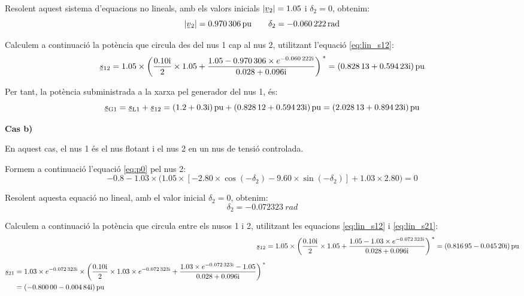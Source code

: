 \begin{exemple}
    Resolent aquest sistema d'equacions no lineals, amb els valors inicials $|\cmplx{v}_2|=\num{1,05}$ i $\delta_2=0$, obtenim:
    \[ 
    	|\cmplx{v}_2|=\qty{0,970306}{pu} \qquad \delta_2=\qty{-0,060222}{rad} 
    \]

    Calculem a continuació la potència que circula des del nus 1 cap al
    nus 2, utilitzant l'equació \eqref{eq:lin_s12}:
    \[
    \cmplx{s}_{12} = \num{1,05}\times \left( \frac{\complexnum{j0,10}}{2} \times \num{1,05} + \frac{ \num{1,05} -
    \num{0,970306}\times e^{\complexnum{-j0,060222}}} {\complexnum{0,028+j0,096}} \right)^{\,*} = \complexqty{0,82813 + j0,59423}{pu}
    \]

    Per tant, la potència subministrada a la xarxa pel generador del nus
    1, és:
    \[
    \cmplx{s}\ped{G1} = \cmplx{s}\ped{L1} + \cmplx{s}_{12} = \complexqty{1,2+j0,3}{pu} + \complexqty{0,82812 + j 0,59423}{pu} = \complexqty{2,02813 + j 0,89423}{pu}
    \]

    \textbf{Cas b)}

    En aquest cas, el nus 1 és el nus flotant i el nus 2 en un nus
    de tensió controlada.

    Formem a continuació l'equació \eqref{eq:p0} pel nus 2:
    \[
    \num{-0,8} - \num{1,03}\times \bigl( \num{1,05}\times [\num{-2,80}\times\cos(-\delta_2) - \num{9,60}\times\sin(
    -\delta_2)] + \num{1,03}\times \num{2,80} \bigr) = 0
    \]

    Resolent aquesta equació no lineal, amb el valor inicial $\delta_2=0$, obtenim:
    \[
        \delta_2= \qty{-0,072323}{rad}
    \]

    Calculem a continuació la potència que circula entre els nusos 1 i
    2, utilitzant les equacions \eqref{eq:lin_s12} i \eqref{eq:lin_s21}:
    \begin{align*}
    \cmplx{s}_{12} &= \num{1,05} \times\left( \frac{\complexnum{j0,10}}{2} \times \num{1,05} + \frac{ \num{1,05} -
    \num{1,03}\times e^{\complexnum{-j0,072323}}}{\complexnum{0,028+j0,096}} \right)^{\,*} =
    \complexqty{0,81695 - j 0,04520}{pu} \\[1.5ex]
    \begin{split}
    \cmplx{s}_{21} &= \num{1,03}\times e^{\complexnum{-j0,072323}} \times\left( \frac{\complexnum{j0,10}}{2}\times
    \num{1,03}\times e^{\complexnum{-j0,072323}} + \frac{ \num{1,03}\times e^{\complexnum{-j0,072323}} -\num{1,05}}
    {\complexnum{0,028+j0,096}} \right)^{\,*} \\
    &= \complexqty{-0,80000 - j 0,00484}{pu}
    \end{split}
    \end{align*}


\end{exemple}
